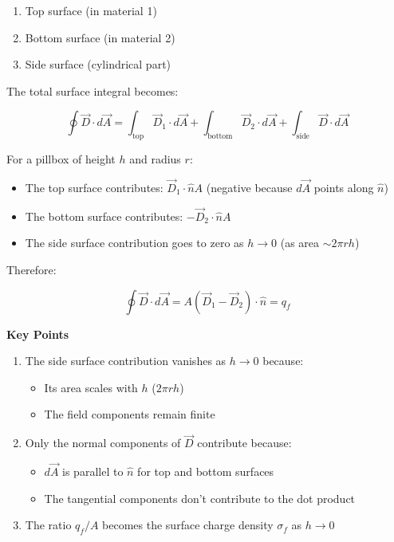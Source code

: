 \documentclass[
  a4paper,
]{book}
\providecommand{\tightlist}{%
  \setlength{\itemsep}{0pt}\setlength{\parskip}{0pt}}
\begin{document}
\begin{enumerate}
\def\labelenumi{\arabic{enumi}.}
\tightlist
\item
  Top surface (in material 1)
\item
  Bottom surface (in material 2)
\item
  Side surface (cylindrical part)
\end{enumerate}

The total surface integral becomes:

\[
\oint \vec{D} \cdot d\vec{A} = \int_{\text{top}} \vec{D}_1 \cdot d\vec{A} + \int_{\text{bottom}} \vec{D}_2 \cdot d\vec{A} + \int_{\text{side}} \vec{D} \cdot d\vec{A}
\]

For a pillbox of height \(h\) and radius \(r\):

\begin{itemize}
\item
  The top surface contributes: \(\vec{D}_1 \cdot \hat{n}A\) (negative
  because \(d\vec{A}\) points along \(\hat{n}\))
\item
  The bottom surface contributes: \(-\vec{D}_2 \cdot \hat{n}A\)
\item
  The side surface contribution goes to zero as \(h \to 0\) (as area
  \(\sim 2\pi rh\))
\end{itemize}

Therefore:

\[
\oint \vec{D} \cdot d\vec{A} = A(\vec{D}_1 - \vec{D}_2) \cdot \hat{n} = q_f
\]

\textbf{Key Points}

\begin{enumerate}
\def\labelenumi{\arabic{enumi}.}
\item
  The side surface contribution vanishes as \(h \to 0\) because:

  \begin{itemize}
  \tightlist
  \item
    Its area scales with \(h\) (\(2\pi rh\))
  \item
    The field components remain finite
  \end{itemize}
\item
  Only the normal components of \(\vec{D}\) contribute because:

  \begin{itemize}
  \tightlist
  \item
    \(d\vec{A}\) is parallel to \(\hat{n}\) for top and bottom surfaces
  \item
    The tangential components don't contribute to the dot product
  \end{itemize}
\item
  The ratio \(q_f/A\) becomes the surface charge density \(\sigma_f\) as
  \(h \to 0\)
\end{enumerate}
\end{document}
